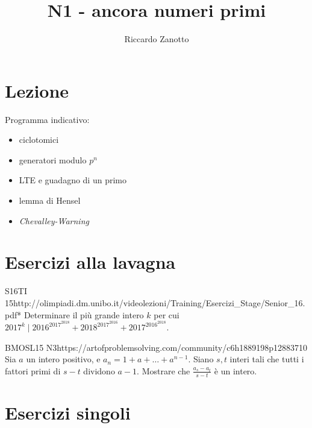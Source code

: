 \documentclass[12pt]{article}
\author{Riccardo Zanotto}
\title{N1 - ancora numeri primi}
\begin{document}
\maketitle


\section{Lezione}

Programma indicativo:

\begin{itemize}
    \item ciclotomici
    \item generatori modulo $p^n$
    \item LTE e guadagno di un primo
    \item lemma di Hensel
    \item \textit{Chevalley-Warning}
\end{itemize}

\section{Esercizi alla lavagna}

\begin{esercizio}{S16TI 15}{http://olimpiadi.dm.unibo.it/videolezioni/Training/Esercizi_Stage/Senior_16.pdf}{*}
    Determinare il più grande intero $k$ per cui $2017^k\mid 2016^{2017^{2018}}+2018^{2017^{2016}}+2017^{2016^{2018}}$.
\end{esercizio}

\begin{esercizio}{BMOSL15 N3}{https://artofproblemsolving.com/community/c6h1889198p12883710}
    Sia $a$ un intero positivo, e $a_n=1+a+\dots+a^{n-1}$. Siano $s,t$ interi tali che tutti i fattori primi di $s-t$ dividono $a-1$. Mostrare che $\frac{a_s-a_t}{s-t}$ è un intero.
\end{esercizio}

\section{Esercizi singoli}
\end{document}
